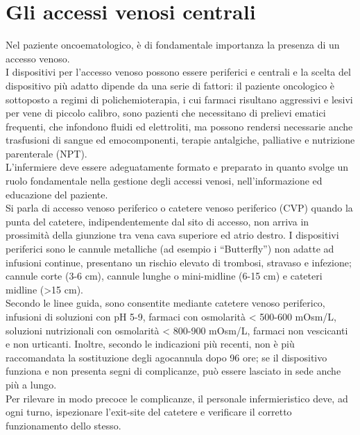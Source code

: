 \section{Gli accessi venosi centrali}

Nel paziente oncoematologico, è di fondamentale importanza la presenza di un accesso venoso.\\ I dispositivi per 
l’accesso venoso possono essere periferici e centrali e la scelta del dispositivo più adatto dipende da una serie di 
fattori: il paziente oncologico è sottoposto a regimi di polichemioterapia, i cui farmaci risultano aggressivi e 
lesivi per vene di piccolo calibro, sono pazienti che necessitano di prelievi ematici frequenti, che infondono fluidi 
ed elettroliti, ma possono rendersi necessarie anche trasfusioni di sangue ed emocomponenti, terapie antalgiche, 
palliative e nutrizione parenterale (NPT).\\
L’infermiere deve essere adeguatamente formato e preparato in quanto svolge un ruolo fondamentale nella gestione 
degli accessi venosi, nell’informazione ed educazione del paziente.\\
Si parla di accesso venoso periferico o catetere venoso periferico (CVP) quando la punta del catetere, 
indipendentemente dal sito di accesso, non arriva in prossimità della giunzione tra vena cava superiore ed atrio destro. 
I dispositivi periferici sono le cannule metalliche (ad esempio i “Butterfly”) non adatte ad infusioni continue, 
presentano un rischio elevato di trombosi, stravaso e infezione; cannule corte (3-6 cm), cannule lunghe o 
mini-midline (6-15 cm) e cateteri midline (>15 cm)\cite{GAVECELTCVC}.\\
Secondo le linee guida, sono consentite mediante catetere venoso periferico, infusioni di soluzioni con pH 5-9, 
farmaci con osmolarità < 500-600 mOsm/L, soluzioni nutrizionali con osmolarità < 800-900 mOsm/L, farmaci non 
vescicanti e non urticanti. Inoltre, secondo le indicazioni più recenti, non è più raccomandata la sostituzione 
degli agocannula dopo 96 ore; se il dispositivo funziona e non presenta segni di complicanze, 
può essere lasciato in sede anche più a lungo\cite{GAVECELTCVC}.\\
Per rilevare in modo precoce le complicanze, il personale infermieristico deve, ad ogni turno, ispezionare 
l'exit-site del catetere e verificare il corretto funzionamento dello stesso\cite{GAVECELTracc2021}.\\

